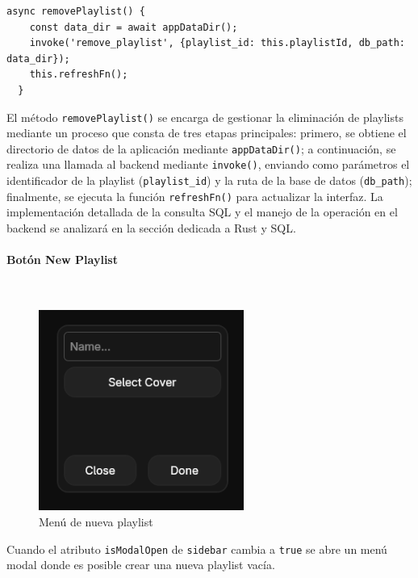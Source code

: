 \documentclass[11pt, a4paper]{article}
\begin{document}
                \begin{lstlisting}[caption={removePlaylist()}]
async removePlaylist() {
    const data_dir = await appDataDir();
    invoke('remove_playlist', {playlist_id: this.playlistId, db_path: data_dir});
    this.refreshFn();
  }
                \end{lstlisting}

                El método \texttt{removePlaylist()} se encarga de gestionar la eliminación de playlists mediante un proceso que consta de tres etapas principales: primero, se obtiene el directorio de datos de la aplicación mediante \texttt{appDataDir()}; a continuación, se realiza una llamada al backend mediante \texttt{invoke()}, enviando como parámetros el identificador de la playlist (\texttt{playlist\_id}) y la ruta de la base de datos (\texttt{db\_path}); finalmente, se ejecuta la función \texttt{refreshFn()} para actualizar la interfaz. La implementación detallada de la consulta SQL y el manejo de la operación en el backend se analizará en la sección dedicada a Rust y SQL.

                \paragraph{Botón New Playlist}
                ‎ \\

                \begin{figure}[H]
                    \centering
                    \includegraphics[width=0.6\textwidth]{media/screenshots/new_playlist.png}
                    \caption{Menú de nueva playlist}
                    \label{fig:nueva playlist}
                \end{figure}

                Cuando el atributo \texttt{isModalOpen} de \texttt{sidebar} cambia a \texttt{true} se abre un menú modal donde es posible crear una nueva playlist vacía.
\end{document}
